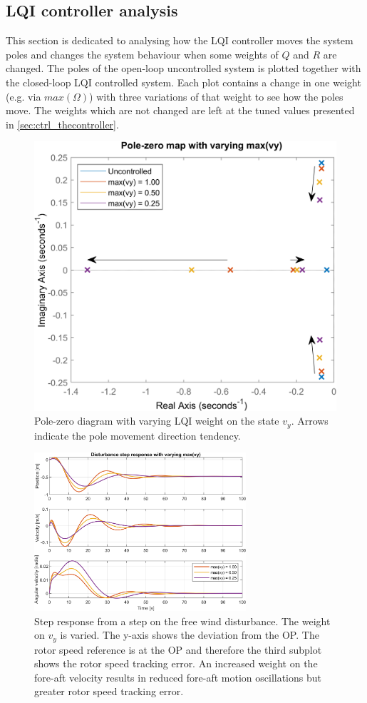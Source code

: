 \subsection{LQI controller analysis}
This section is dedicated to analysing how the LQI controller moves the system poles and changes the system behaviour when some weights of $ Q $ and $ R $ are changed. The poles of the open-loop uncontrolled system is plotted together with the closed-loop LQI controlled system. Each plot contains a change in one weight (e.g. via $ max(\Omega) $) with three variations of that weight to see how the poles move. The weights which are not changed are left at the tuned values presented in \cref{sec:ctrl_thecontroller}. 

\begin{figure}[ht]
	\centering
	\includegraphics[width=.55\textwidth]{Graphics/LQI pole zero/02_pzmap_vy}
	\caption{Pole-zero diagram with varying LQI weight on the state $ v_y $. Arrows indicate the pole movement direction tendency.}
	\label{fig:pzmap_vy}
\end{figure}
\begin{figure}[ht]
	\centering
	\includegraphics[width=0.7\textwidth]{Graphics/LQI pole zero/102_step_vy.png}
	\caption{Step response from a step on the free wind disturbance. The weight on $ v_y $ is varied. The y-axis shows the deviation from the OP. The rotor speed reference is at the OP and therefore the third subplot shows the rotor speed tracking error. An increased weight on the fore-aft velocity results in reduced fore-aft motion oscillations but greater rotor speed tracking error.}
	\label{fig:step_vy}
\end{figure}
